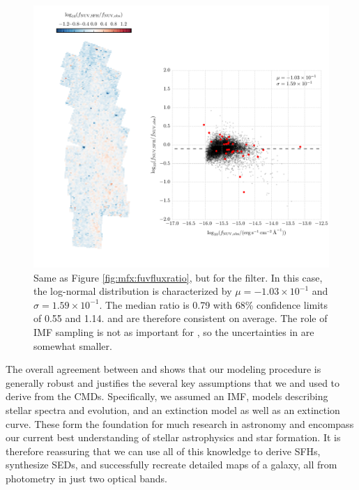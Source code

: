 \begin{figure}
\centering
\includegraphics[width=\textwidth]{m31flux-figures/flux_nuv_sfh-vs-obs.pdf}
\caption[Ratio of the synthetic flux to the observed flux in the \nuv{}
filter.]{Same as Figure \ref{fig:mfx:fuvfluxratio}, but for the \nuv{} filter.
    In this case, the log-normal distribution is characterized by $\mu =
    -1.03\times 10^{-1}$ and $\sigma = 1.59\times 10^{-1}$. The median ratio is
    0.79 with 68\% confidence limits of 0.55 and 1.14. \fnuvsfh{} and
    \fnuvobs{} are therefore consistent on average. The role of IMF sampling is
    not as important for \fnuvobs{}, so the uncertainties in \fnuvsfh{} are
    somewhat smaller.
}
\label{fig:mfx:nuvfluxratio}
\end{figure}


The overall agreement between \fxsfh{} and \fxobs{} shows that our modeling
procedure is generally robust and justifies the several key assumptions that we
and \citet{Lewis:2014} used to derive \fxsfh{} from the CMDs. Specifically, we
assumed an IMF, models describing stellar spectra and evolution, and an
extinction model as well as an extinction curve. These form the foundation for
much research in astronomy and encompass our current best understanding of
stellar astrophysics and star formation. It is therefore reassuring that we can
use all of this knowledge to derive SFHs, synthesize SEDs, and successfully
recreate detailed maps of a galaxy, all from photometry in just two optical
bands.

